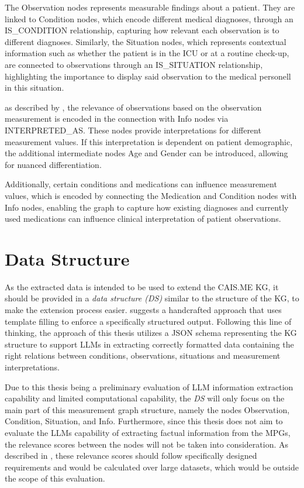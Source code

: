 \documentclass[bs, english]{stthesis}
\begin{document}
The Observation nodes represents measurable findings about a patient. They are linked to Condition nodes, which encode different medical diagnoses, through an IS\_CONDITION relationship, capturing  how relevant each observation is to different diagnoses. Similarly, the Situation nodes, which represents contextual information such as whether the patient is in the ICU or at a routine check-up, are connected to observations through an IS\_SITUATION relationship, highlighting the importance to display said observation to the medical personell in this situation.

as described by \citeauthor{TOM}, the relevance of observations based on the observation measurement is encoded in the connection with Info nodes via INTERPRETED\_AS. These nodes provide interpretations for different measurement values. If this interpretation is dependent on patient demographic, the additional intermediate nodes Age and Gender can be introduced, allowing for nuanced differentiation. 

Additionally, certain conditions and medications can influence measurement values, which is encoded by connecting the Medication and Condition nodes with Info nodes, enabling the graph to capture how existing diagnoses and currently used medications can influence clinical interpretation of patient observations.

\section{Data Structure}

As the extracted data is intended to be used to extend the CAIS.ME KG, it should be provided in a \textit{data structure (DS)} similar to the structure of the KG, to make the extension process easier.  suggests a handcrafted approach that uses template filling to enforce a specifically structured output. Following this line of thinking, the approach of this thesis utilizes a JSON schema representing the KG structure to support LLMs in extracting correctly formatted data containing the right relations between conditions, observations, situations and measurement interpretations.

Due to this thesis being a preliminary evaluation of LLM information extraction capability and limited computational capability, the \textit{DS} will only focus on the main part of this measurement graph structure, namely the nodes Observation, Condition, Situation, and Info. Furthermore, since this thesis does not aim to evaluate the LLMs capability of extracting factual information from the MPGs, the relevance scores between the nodes will not be taken into consideration. As \citeauthor{TOM} described in \cite[Section 7.2.2, Graph Generation]{TOM}, these relevance scores should follow specifically designed requirements and would be calculated over large datasets, which would be outside the scope of this evaluation.
\end{document}
